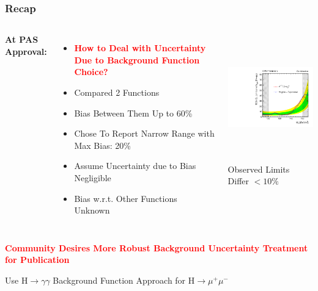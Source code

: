 \documentclass{beamer}
\newcommand{\hgamgam}{\ensuremath{\mathrm{H} \rightarrow \gamma\gamma}}
\newcommand{\hmm}{\ensuremath{\mathrm{H} \rightarrow \mu^+\mu^-}}
\newcommand{\tredbf}[1]{\textcolor{red}{\bf #1}}
\begin{document}
\begin{frame}
\frametitle{Recap}
\vspace{-1em}
\begin{columns}[c]
 \column{60mm}
    \textbf{At PAS Approval:}
    \begin{itemize}
    \small
      \item \tredbf{How to Deal with Uncertainty Due to Background Function Choice?}
      \item Compared 2 Functions
      \item Bias Between Them Up to 60\%
      \item Chose To Report Narrow Range with Max Bias: 20\%
      \item Assume Uncertainty due to Bias Negligible
      \item Bias w.r.t. Other Functions Unknown
    \end{itemize}
 \column{60mm}
    \begin{center}
      \includegraphics[height=55mm]{plots/limitsComparison_m110to160.pdf}
      \\ \small
      Observed Limits Differ $< 10\%$
    \end{center}
\end{columns}
\begin{center}
  \large \tredbf{Community Desires More Robust Background Uncertainty Treatment for Publication}
\end{center}
\end{frame}


\begin{frame}
  \begin{center}
    \Huge
    Use \hgamgam{} Background Function Approach for \hmm{} 
  \end{center}
\end{frame}
\end{document}
